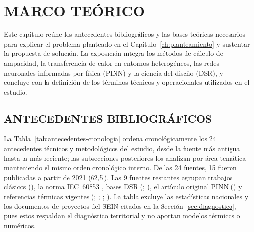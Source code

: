 \chapter{MARCO TEÓRICO}
\label{ch:marco-teorico}
\thispagestyle{empty}

Este capítulo reúne los antecedentes bibliográficos y las bases teóricas necesarios para explicar el problema planteado en el Capítulo~\ref{ch:planteamiento} y sustentar la propuesta de solución. La exposición integra los métodos de cálculo de ampacidad, la transferencia de calor en entornos heterogéneos, las redes neuronales informadas por física (PINN) y la ciencia del diseño (DSR), y concluye con la definición de los términos técnicos y operacionales utilizados en el estudio.

\section{ANTECEDENTES BIBLIOGRÁFICOS}
\label{sec:antecedentes}

La Tabla~\ref{tab:antecedentes-cronologia} ordena cronológicamente los 24 antecedentes técnicos y metodológicos del estudio, desde la fuente más antigua hasta la más reciente; las subsecciones posteriores los analizan por área temática manteniendo el mismo orden cronológico interno. De las 24 fuentes, 15 fueron publicadas a partir de 2021 (62,5\,\pct{}). Las 9 fuentes restantes agrupan trabajos clásicos (\textcite{neher1957}), la norma IEC~60853 \parencite{iec60853}, bases DSR (\textcite{peffers2007}; \textcite{gregor2013}), el artículo original PINN (\textcite{raissi2019}) y referencias térmicas vigentes (\textcite{aras2005}; \textcite{oclon2015}; \textcite{enescu2020}; \textcite{patel2013skin}). La tabla excluye las estadísticas nacionales y los documentos de proyectos del SEIN citados en la Sección~\ref{sec:diagnostico}, pues estos respaldan el diagnóstico territorial y no aportan modelos térmicos o numéricos.

